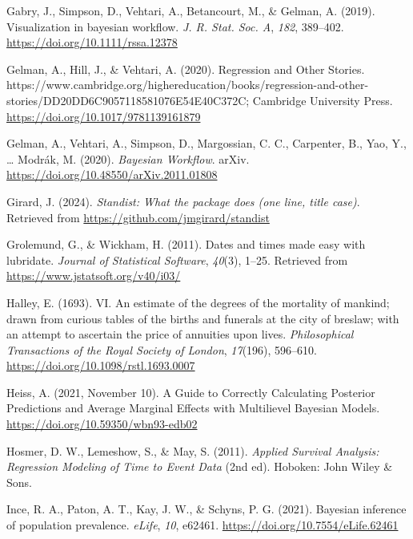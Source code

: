 \documentclass[
  man, donotrepeattitle,floatsintext]{apa6}
\newlength{\cslhangindent}
\newenvironment{CSLReferences}[2] %
 {\begin{list}{}{%
  \setlength{\itemindent}{0pt}
  \setlength{\leftmargin}{0pt}
  \setlength{\parsep}{0pt}
  \ifodd #1
   \setlength{\leftmargin}{\cslhangindent}
   \setlength{\itemindent}{-1\cslhangindent}
  \fi
  \setlength{\itemsep}{#2\baselineskip}}}
 {\end{list}}
\begin{document}
\begin{CSLReferences}{1}{0}
Gabry, J., Simpson, D., Vehtari, A., Betancourt, M., \& Gelman, A. (2019). Visualization in bayesian workflow. \emph{J. R. Stat. Soc. A}, \emph{182}, 389--402. \url{https://doi.org/10.1111/rssa.12378}

Gelman, A., Hill, J., \& Vehtari, A. (2020). Regression and {Other Stories}. https://www.cambridge.org/highereducation/books/regression-and-other-stories/DD20DD6C9057118581076E54E40C372C; Cambridge University Press. \url{https://doi.org/10.1017/9781139161879}

Gelman, A., Vehtari, A., Simpson, D., Margossian, C. C., Carpenter, B., Yao, Y., \ldots{} Modrák, M. (2020). \emph{Bayesian {Workflow}}. arXiv. \url{https://doi.org/10.48550/arXiv.2011.01808}

Girard, J. (2024). \emph{Standist: What the package does (one line, title case)}. Retrieved from \url{https://github.com/jmgirard/standist}

Grolemund, G., \& Wickham, H. (2011). Dates and times made easy with {lubridate}. \emph{Journal of Statistical Software}, \emph{40}(3), 1--25. Retrieved from \url{https://www.jstatsoft.org/v40/i03/}

Halley, E. (1693). VI. An estimate of the degrees of the mortality of mankind; drawn from curious tables of the births and funerals at the city of breslaw; with an attempt to ascertain the price of annuities upon lives. \emph{Philosophical Transactions of the Royal Society of London}, \emph{17}(196), 596--610. \url{https://doi.org/10.1098/rstl.1693.0007}

Heiss, A. (2021, November 10). A Guide to Correctly Calculating Posterior Predictions and Average Marginal Effects with Multilievel {Bayesian} Models. \url{https://doi.org/10.59350/wbn93-edb02}

Hosmer, D. W., Lemeshow, S., \& May, S. (2011). \emph{Applied {Survival Analysis}: {Regression Modeling} of {Time} to {Event Data}} (2nd ed). Hoboken: John Wiley \& Sons.

Ince, R. A., Paton, A. T., Kay, J. W., \& Schyns, P. G. (2021). Bayesian inference of population prevalence. \emph{eLife}, \emph{10}, e62461. \url{https://doi.org/10.7554/eLife.62461}


\end{CSLReferences}
\end{document}
